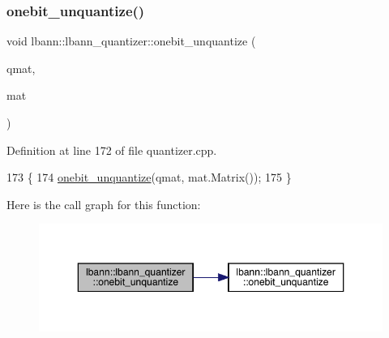 \subsubsection{\texorpdfstring{onebit\+\_\+unquantize()}{onebit\_unquantize()}\hspace{0.1cm}{\footnotesize\ttfamily [2/2]}}
{\footnotesize\ttfamily void lbann\+::lbann\+\_\+quantizer\+::onebit\+\_\+unquantize (\begin{DoxyParamCaption}\item[{const \hyperlink{classlbann_1_1lbann__quantizer_a399f3f8c393b6021b43e95d1ce6ea28c}{Quantized\+Matrix} \&}]{qmat,  }\item[{\hyperlink{base_8hpp_a0fab5387556805cfeac3e7e567bf66c5}{Dist\+Mat} \&}]{mat }\end{DoxyParamCaption})}



Definition at line 172 of file quantizer.\+cpp.


\begin{DoxyCode}
173                                                       \{
174   \hyperlink{classlbann_1_1lbann__quantizer_ad5592daa122b40c275cce3dc93bba41e}{onebit\_unquantize}(qmat, mat.Matrix());
175 \}
\end{DoxyCode}
Here is the call graph for this function\+:\nopagebreak
\begin{figure}[H]
\begin{center}
\leavevmode
\includegraphics[width=350pt]{classlbann_1_1lbann__quantizer_afc7a47fb5a5e87a09f2913a46a2bacf7_cgraph}
\end{center}
\end{figure}
\mbox{\label{classlbann_1_1lbann__quantizer_a879cea8464408b8265be9e55edd83b2c}} 
